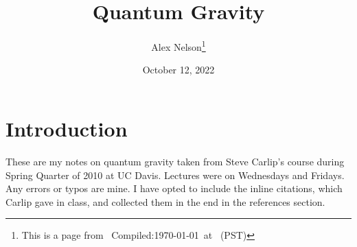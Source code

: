 \documentclass{article}
\title{Quantum Gravity}
\author{Alex Nelson\thanks{This is a page from \homeurl{}\hfil\break\indent\;\, Compiled:\enspace\today\ at \currenttime\ (PST)}}
\date{October 12, 2022}
\begin{document}
\maketitle

\section*{Introduction}
These are my notes on quantum gravity taken from Steve Carlip's course during Spring Quarter of 2010 at UC Davis. Lectures were on Wednesdays and Fridays.
Any errors or typos are mine. I have opted to include the inline citations, which Carlip gave in class, and collected them in the end in the references section.










\end{document}
